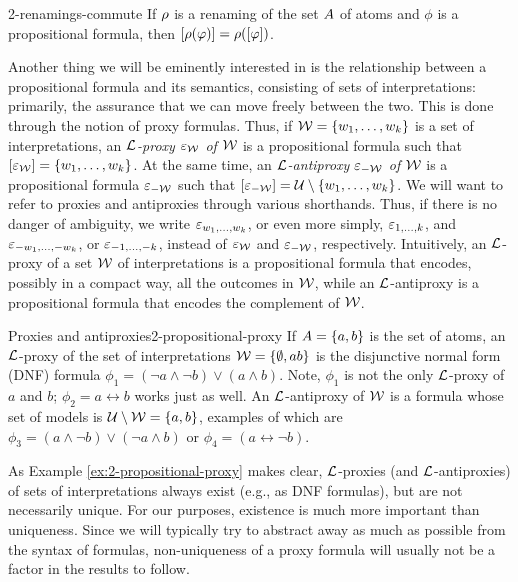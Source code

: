\begin{prp}{}{2-renamings-commute}
	If $\rho$ is a renaming of the set $A$ of atoms and
	$\phi$ is a propositional formula, 
	then $[\rho(\varphi)] = \rho([\varphi])$.
\end{prp}

Another thing we will be eminently interested in is 
the relationship between a propositional formula and its semantics,
consisting of sets of interpretations:
primarily, the assurance that we can move freely between the two.
This is done through the notion of proxy formulas.
Thus, if $\mathcal{W} = \{w_1, \dots, w_k\}$ is a set of interpretations, 
an \emph{$\mathcal{L}$-proxy $\varepsilon_{\mathcal{W}}$ of $\mathcal{W}$}
is a propositional formula such that $[\varepsilon_{\mathcal{W}}]=\{w_1,\dots,w_k\}$.
At the same time,
an \emph{$\mathcal{L}$-antiproxy $\varepsilon_{-\mathcal{W}}$ of $\mathcal{W}$} is a propositional formula 
$\varepsilon_{-\mathcal{W}}$ such that $[\varepsilon_{-\mathcal{W}}]=\mathcal{U}\setminus\{w_1,\dots,w_k\}$.
We will want to refer to proxies and antiproxies through various shorthands.
Thus, if there is no danger of ambiguity, we write 
$\varepsilon_{w_1,\dots,w_k}$, or even more simply, $\varepsilon_{1,\dots,k}$,
and $\varepsilon_{-w_1,\dots,-w_k}$, or $\varepsilon_{-1,\dots,-k}$,
instead of $\varepsilon_{\mathcal{W}}$ and $\varepsilon_{-\mathcal{W}}$, respectively.
Intuitively, an $\mathcal{L}$-proxy of a set $\mathcal{W}$ of interpretations 
is a propositional formula that encodes, possibly in a compact way, 
all the outcomes in $\mathcal{W}$,
while an $\mathcal{L}$-antiproxy is a propositional formula that 
encodes the complement of $\mathcal{W}$.

\begin{xmpl}{Proxies and antiproxies}{2-propositional-proxy}
	If $A=\{a,b\}$ is the set of atoms, 
	an $\mathcal{L}$-proxy of the set of interpretations $\mathcal{W}=\{\emptyset,ab\}$ is the 
	disjunctive normal form (DNF) formula
	$\phi_1 = (\lnot a\land\lnot b)\lor( a \land b)$.
	Note, $\phi_1$ is not the only $\mathcal{L}$-proxy of $a$ and $b$;
	$\phi_2=a\leftrightarrow b$ works just as well.
	An $\mathcal{L}$-antiproxy of $\mathcal{W}$ is a formula whose set of models is
	$\mathcal{U}\setminus\mathcal{W} = \{a,b\}$,
	examples of which are $\phi_3 = (a\land\lnot b)\lor(\lnot a\land b)$ or $\phi_4 = (a\leftrightarrow\lnot b)$.
\end{xmpl}

As Example \ref{ex:2-propositional-proxy} makes clear, 
$\mathcal{L}$-proxies (and $\mathcal{L}$-antiproxies)
of sets of interpretations always exist (e.g., as DNF formulas),
but are not necessarily unique. For our purposes, existence 
is much more important than uniqueness. 
Since we will typically try to abstract away as much as possible from the syntax 
of formulas, non-uniqueness of a proxy formula will usually not be a factor 
in the results to follow.

